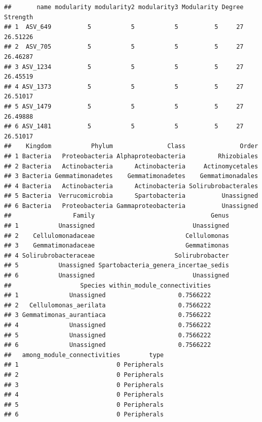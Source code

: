 \documentclass[
]{book}
\newenvironment{Shaded}{\begin{snugshade}}{\end{snugshade}}
\newcommand{\AttributeTok}[1]{\textcolor[rgb]{0.13,0.29,0.53}{#1}}
\newcommand{\FunctionTok}[1]{\textcolor[rgb]{0.13,0.29,0.53}{\textbf{#1}}}
\newcommand{\NormalTok}[1]{#1}
\newcommand{\SpecialCharTok}[1]{\textcolor[rgb]{0.81,0.36,0.00}{\textbf{#1}}}
\newcommand{\StringTok}[1]{\textcolor[rgb]{0.31,0.60,0.02}{#1}}
\begin{document}
\begin{verbatim}
##       name modularity modularity2 modularity3 Modularity Degree Strength
## 1  ASV_649          5           5           5          5     27 26.51226
## 2  ASV_705          5           5           5          5     27 26.46287
## 3 ASV_1234          5           5           5          5     27 26.45519
## 4 ASV_1373          5           5           5          5     27 26.51017
## 5 ASV_1479          5           5           5          5     27 26.49888
## 6 ASV_1481          5           5           5          5     27 26.51017
##    Kingdom           Phylum               Class               Order
## 1 Bacteria   Proteobacteria Alphaproteobacteria         Rhizobiales
## 2 Bacteria   Actinobacteria      Actinobacteria     Actinomycetales
## 3 Bacteria Gemmatimonadetes    Gemmatimonadetes    Gemmatimonadales
## 4 Bacteria   Actinobacteria      Actinobacteria Solirubrobacterales
## 5 Bacteria  Verrucomicrobia      Spartobacteria          Unassigned
## 6 Bacteria   Proteobacteria Gammaproteobacteria          Unassigned
##                 Family                                Genus
## 1           Unassigned                           Unassigned
## 2    Cellulomonadaceae                         Cellulomonas
## 3    Gemmatimonadaceae                         Gemmatimonas
## 4 Solirubrobacteraceae                      Solirubrobacter
## 5           Unassigned Spartobacteria_genera_incertae_sedis
## 6           Unassigned                           Unassigned
##                   Species within_module_connectivities
## 1              Unassigned                    0.7566222
## 2   Cellulomonas_aerilata                    0.7566222
## 3 Gemmatimonas_aurantiaca                    0.7566222
## 4              Unassigned                    0.7566222
## 5              Unassigned                    0.7566222
## 6              Unassigned                    0.7566222
##   among_module_connectivities        type
## 1                           0 Peripherals
## 2                           0 Peripherals
## 3                           0 Peripherals
## 4                           0 Peripherals
## 5                           0 Peripherals
## 6                           0 Peripherals
\end{verbatim}

\begin{Shaded}
\end{Shaded}
\end{document}
